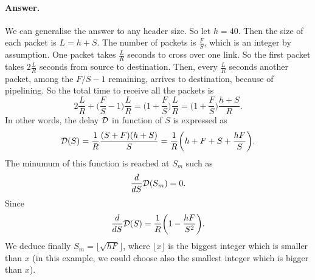 
\paragraph{Answer.}

We can generalise the answer to any header size. So let \(h =
40\). Then the size of each packet is \(L = h + S\). The number of
packets is \(\frac{F}{S}\), which is an integer by assumption. One
packet takes \(\frac{L}{R}\) seconds to cross over one link. So the
first packet takes \(2{\frac{L}{R}}\) seconds from source to
destination. Then, every \(\frac{L}{R}\) seconds another packet, among
the \(F/S-1\) remaining, arrives to destination, because of
pipelining. So the total time to receive all the packets is
\[
    2{\frac{L}{R}} + \biggl(\frac{F}{S}-1\biggr)\frac{L}{R} 
  = \biggl(1 + \frac{F}{S}\biggr)\frac{L}{R} 
  = \biggl(1 + \frac{F}{S}\biggr)\frac{h + S}{R}.
\]
In other words, the delay \({\cal D}\) in function of \(S\) is
expressed as
\[
  {\cal D}(S) = \frac{1}{R}\frac{(S + F)(h + S)}{S} =
  \frac{1}{R}\biggl(h + F + S + \frac{hF}{S}\biggr).
\]
The minumum of this function is reached at \(S_{m}\) such as
\[
  \frac{d}{dS} {\cal D} (S_m) = 0.
\]
Since
\[
  \frac{d}{dS} {\cal D} (S) = \frac{1}{R}\biggl(1 -
  \frac{hF}{S^2}\biggr).
\]
We deduce finally \(S_m = \lfloor\sqrt{hF}\rfloor\), where
\(\lfloor{x}\rfloor\) is the biggest integer which is smaller than
\(x\) (in this example, we could choose also the smallest integer
which is bigger than \(x\)).
